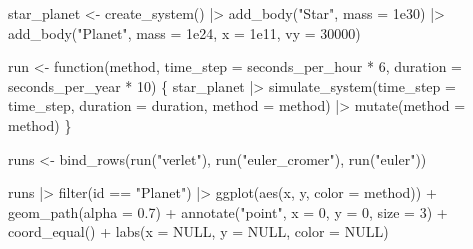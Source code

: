 \documentclass[
  10.5pt,
  letterpaper,
]{scrbook}
\newenvironment{Shaded}{\begin{snugshade}}{\end{snugshade}}
\newcommand{\AttributeTok}[1]{\textcolor[rgb]{0.00,0.00,0.00}{#1}}
\newcommand{\ConstantTok}[1]{\textcolor[rgb]{0.00,0.00,0.00}{#1}}
\newcommand{\ControlFlowTok}[1]{\textcolor[rgb]{0.00,0.00,0.00}{#1}}
\newcommand{\DecValTok}[1]{\textcolor[rgb]{0.00,0.00,0.00}{#1}}
\newcommand{\FloatTok}[1]{\textcolor[rgb]{0.00,0.00,0.00}{#1}}
\newcommand{\FunctionTok}[1]{\textcolor[rgb]{0.00,0.00,0.00}{#1}}
\newcommand{\NormalTok}[1]{\textcolor[rgb]{0.00,0.00,0.00}{#1}}
\newcommand{\OtherTok}[1]{\textcolor[rgb]{0.00,0.00,0.00}{#1}}
\newcommand{\SpecialCharTok}[1]{\textcolor[rgb]{0.00,0.00,0.00}{#1}}
\newcommand{\StringTok}[1]{\textcolor[rgb]{0.00,0.00,0.00}{#1}}
\theoremstyle{plain}
\theoremstyle{remark}
\begin{document}
\begin{Shaded}
\begin{Highlighting}[]
\NormalTok{star\_planet }\OtherTok{\textless{}{-}} \FunctionTok{create\_system}\NormalTok{() }\SpecialCharTok{|\textgreater{}}
  \FunctionTok{add\_body}\NormalTok{(}\StringTok{"Star"}\NormalTok{,   }\AttributeTok{mass =} \FloatTok{1e30}\NormalTok{) }\SpecialCharTok{|\textgreater{}}
  \FunctionTok{add\_body}\NormalTok{(}\StringTok{"Planet"}\NormalTok{, }\AttributeTok{mass =} \FloatTok{1e24}\NormalTok{, }\AttributeTok{x =} \FloatTok{1e11}\NormalTok{, }\AttributeTok{vy =} \DecValTok{30000}\NormalTok{)}

\NormalTok{run }\OtherTok{\textless{}{-}} \ControlFlowTok{function}\NormalTok{(method, }\AttributeTok{time\_step =}\NormalTok{ seconds\_per\_hour }\SpecialCharTok{*} \DecValTok{6}\NormalTok{,}
                \AttributeTok{duration =}\NormalTok{ seconds\_per\_year }\SpecialCharTok{*} \DecValTok{10}\NormalTok{) \{}
\NormalTok{  star\_planet }\SpecialCharTok{|\textgreater{}}
    \FunctionTok{simulate\_system}\NormalTok{(}\AttributeTok{time\_step =}\NormalTok{ time\_step, }\AttributeTok{duration =}\NormalTok{ duration,}
                    \AttributeTok{method =}\NormalTok{ method) }\SpecialCharTok{|\textgreater{}}
    \FunctionTok{mutate}\NormalTok{(}\AttributeTok{method =}\NormalTok{ method)}
\NormalTok{\}}

\NormalTok{runs }\OtherTok{\textless{}{-}} \FunctionTok{bind\_rows}\NormalTok{(}\FunctionTok{run}\NormalTok{(}\StringTok{"verlet"}\NormalTok{), }\FunctionTok{run}\NormalTok{(}\StringTok{"euler\_cromer"}\NormalTok{), }\FunctionTok{run}\NormalTok{(}\StringTok{"euler"}\NormalTok{))}
\end{Highlighting}
\end{Shaded}

\begin{Shaded}
\begin{Highlighting}[]
\NormalTok{runs }\SpecialCharTok{|\textgreater{}}
  \FunctionTok{filter}\NormalTok{(id }\SpecialCharTok{==} \StringTok{"Planet"}\NormalTok{) }\SpecialCharTok{|\textgreater{}}
  \FunctionTok{ggplot}\NormalTok{(}\FunctionTok{aes}\NormalTok{(x, y, }\AttributeTok{color =}\NormalTok{ method)) }\SpecialCharTok{+}
  \FunctionTok{geom\_path}\NormalTok{(}\AttributeTok{alpha =} \FloatTok{0.7}\NormalTok{) }\SpecialCharTok{+}
  \FunctionTok{annotate}\NormalTok{(}\StringTok{"point"}\NormalTok{, }\AttributeTok{x =} \DecValTok{0}\NormalTok{, }\AttributeTok{y =} \DecValTok{0}\NormalTok{, }\AttributeTok{size =} \DecValTok{3}\NormalTok{) }\SpecialCharTok{+}
  \FunctionTok{coord\_equal}\NormalTok{() }\SpecialCharTok{+}
  \FunctionTok{labs}\NormalTok{(}\AttributeTok{x =} \ConstantTok{NULL}\NormalTok{, }\AttributeTok{y =} \ConstantTok{NULL}\NormalTok{, }\AttributeTok{color =} \ConstantTok{NULL}\NormalTok{)}
\end{Highlighting}
\end{Shaded}
\end{document}
